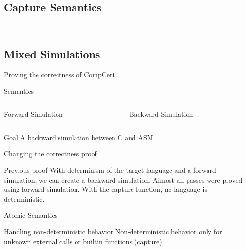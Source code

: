 \subsection{Capture Semantics}
\begin{frame}{\subsecname}

  \\

\end{frame}

\subsection{Mixed Simulations}
\begin{frame}{Proving the correctness of CompCert}
  \begin{block}{Semantics}
  \end{block}
  \vfill
  \begin{columns}[T] %
    \begin{column}{.48\textwidth}
      \begin{block}{Forward Simulation}
      \end{block}
    \end{column}%
    \hfill%
    \begin{column}{.48\textwidth}
      \begin{block}{Backward Simulation}
      \end{block}
    \end{column}%
  \end{columns}
  \vfill
  \begin{exampleblock}{Goal}
    A backward simulation between C and ASM
  \end{exampleblock}
\end{frame}

\begin{frame}{Changing the correctness proof}
  \begin{alertblock}{Previous proof}
    With determinism of the target language and a forward simulation, we can create a backward simulation.
    Almost all passes were proved using forward simulation.
    With the capture function, no language is deterministic.
  \end{alertblock}
  \vfill
  \begin{block}{Atomic Semantics}
  \end{block}
  \vfill
  \begin{exampleblock}{Handling non-deterministic behavior}
    Non-deterministic behavior only for unknown external calls or builtin functions (capture).
  \end{exampleblock}
\end{frame}

